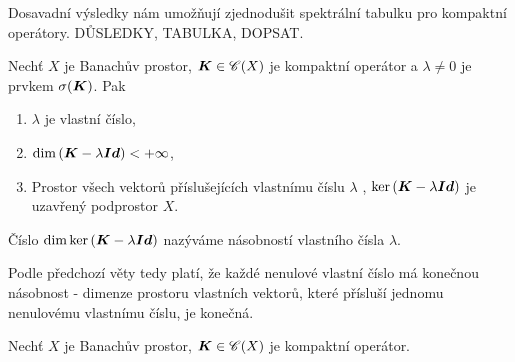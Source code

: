 Dosavadní výsledky nám umožňují zjednodušit spektrální tabulku pro kompaktní operátory. DŮSLEDKY, TABULKA, DOPSAT.

\begin{lemma}
Nechť $X$ je Banachův prostor, $\boldsymbol{K} \in \mathscr{C}(X)$ je kompaktní operátor a $\lambda \neq 0$ je prvkem $\sigma(\boldsymbol{K})$. Pak \begin{enumerate}
    \item $\lambda$ je vlastní číslo,
    \item $\mathrm{dim} \,(\boldsymbol{K} - \lambda \boldsymbol{Id} ) < + \infty$,
    \item Prostor všech vektorů příslušejících vlastnímu číslu $\lambda$ , $\mathrm{ker}\, (\boldsymbol{K} - \lambda \boldsymbol{Id} )$ je uzavřený podprostor $X$.
\end{enumerate}
\end{lemma}

\begin{definition}
Číslo $\mathrm{dim} \, \mathrm{ker}\, (\boldsymbol{K} - \lambda \boldsymbol{Id} )$ nazýváme násobností vlastního čísla $\lambda$.
\end{definition}

Podle předchozí věty tedy platí, že každé nenulové vlastní číslo má konečnou násobnost - dimenze prostoru vlastních vektorů, které přísluší jednomu nenulovému vlastnímu číslu, je konečná.

\begin{lemma}
Nechť $X$ je Banachův prostor, $\boldsymbol{K} \in \mathscr{C}(X)$ je kompaktní operátor. 
\end{lemma}